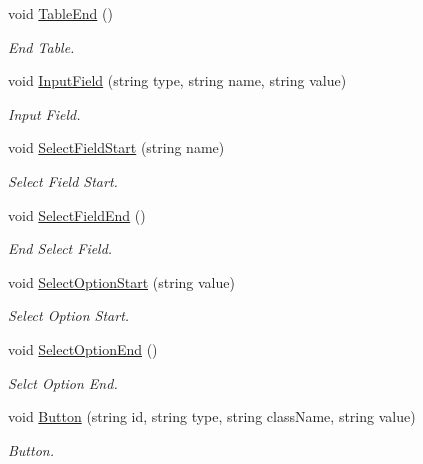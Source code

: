 \begin{DoxyCompactItemize}
void \hyperlink{classHTMLTags_a0655d9f70a8c1a61c406280d8fb9df7a}{Table\-End} ()
\begin{DoxyCompactList}\small\item\em End Table. \end{DoxyCompactList}\item 
void \hyperlink{classHTMLTags_ab515d13346f63b00f7696374e682344e}{Input\-Field} (string type, string name, string value)
\begin{DoxyCompactList}\small\item\em Input Field. \end{DoxyCompactList}\item 
void \hyperlink{classHTMLTags_adb6e7ef0a1320dbf6d4acbe1ea3e418f}{Select\-Field\-Start} (string name)
\begin{DoxyCompactList}\small\item\em Select Field Start. \end{DoxyCompactList}\item 
void \hyperlink{classHTMLTags_adde967a90e03f4b5168b9bffd319980b}{Select\-Field\-End} ()
\begin{DoxyCompactList}\small\item\em End Select Field. \end{DoxyCompactList}\item 
void \hyperlink{classHTMLTags_a09f91c8601aed3aa2d0978123225afaa}{Select\-Option\-Start} (string value)
\begin{DoxyCompactList}\small\item\em Select Option Start. \end{DoxyCompactList}\item 
void \hyperlink{classHTMLTags_ae312980d20e3dea0469fdcb730fb975e}{Select\-Option\-End} ()
\begin{DoxyCompactList}\small\item\em Selct Option End. \end{DoxyCompactList}\item 
void \hyperlink{classHTMLTags_ab6dbb027d808e7b708a4ece7e911ceee}{Button} (string id, string type, string class\-Name, string value)
\begin{DoxyCompactList}\small\item\em Button. \end{DoxyCompactList}\end{DoxyCompactItemize}
